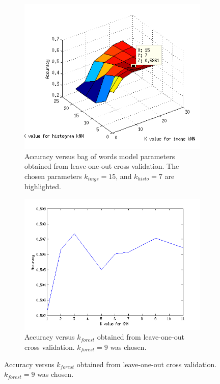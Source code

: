 \documentclass{article} %
\begin{document}
\begin{figure}[htb]
\centering
	\begin{subfigure}[t]{0.33\textwidth}
		\centering
		\includegraphics[width = \textwidth]{./img/pickK}
		\parbox{.95\textwidth}{\caption{Accuracy versus bag of words model parameters obtained from leave-one-out cross validation. The chosen parameters $k_{imgs} = 15$, and $k_{histo} = 7$ are highlighted. \label{fig:Kbag} }}
			\end{subfigure}
	\begin{subfigure}[t]{0.33\textwidth}
		\centering
		\includegraphics[width = \textwidth]{./img/kforest}
		\parbox{0.95\textwidth}{\caption{Accuracy versus $k_{forest}$ obtained from leave-one-out cross validation. $k_{forest} = 9$ was chosen. \label{fig:Kforest}}}

\end{subfigure}
\end{figure}
\end{document}
